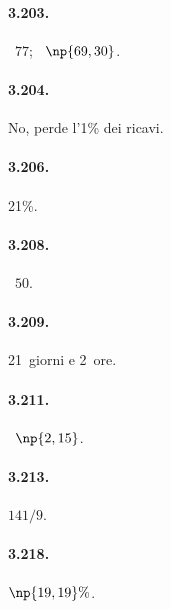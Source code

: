 \begin{multicols}{3}
\paragraph{3.203.} \officialeuro~$77$; \officialeuro~$\np{69,30}$.

\paragraph{3.204.} No, perde l'1\% dei ricavi.

\paragraph{3.206.} 21\%.

\paragraph{3.208.} \officialeuro~$50$.

\paragraph{3.209.} 21~giorni e 2~ore.

\paragraph{3.211.} \officialeuro~$\np{2,15}$.

\paragraph{3.213.} $ 141/9 $.

\paragraph{3.218.} $\np{19,19}\%$.

\end{multicols}
